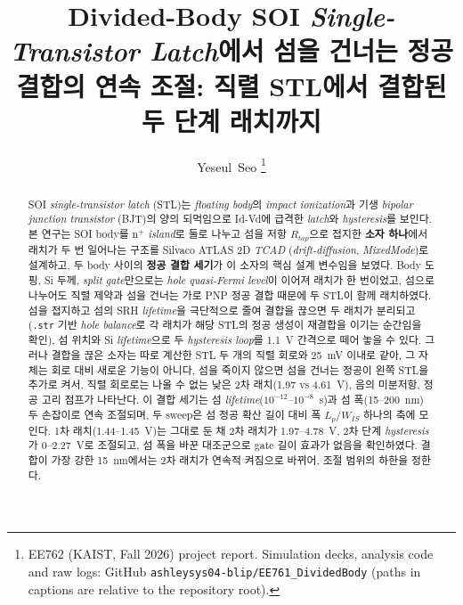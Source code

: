 \documentclass[journal]{IEEEtran}
\begin{document}
\title{Divided-Body SOI \textit{Single-Transistor Latch}에서 섬을 건너는 정공 결합의 연속 조절: 직렬 STL에서 결합된 두 단계 래치까지}

\author{Yeseul~Seo%
\thanks{EE762 (KAIST, Fall 2026) project report. Simulation decks, analysis code and raw logs: GitHub \texttt{ashleysys04-blip/EE761\_DividedBody} (paths in captions are relative to the repository root).}}

\maketitle

\begin{abstract}
SOI \textit{single-transistor latch} (STL)는 \textit{floating body}의 \textit{impact ionization}과 기생 \textit{bipolar junction transistor} (BJT)의 양의 되먹임으로 Id-Vd에 급격한 \textit{latch}와 \textit{hysteresis}를 보인다. 본 연구는 SOI body를 n$^+$ \textit{island}로 둘로 나누고 섬을 저항 $R_{tap}$으로 접지한 \textbf{소자 하나}에서 래치가 두 번 일어나는 구조를 Silvaco ATLAS 2D \textit{TCAD} (\textit{drift-diffusion}, \textit{MixedMode})로 설계하고, 두 body 사이의 \textbf{정공 결합 세기}가 이 소자의 핵심 설계 변수임을 보였다. Body 도핑, Si 두께, \textit{split gate}만으로는 \textit{hole quasi-Fermi level}이 이어져 래치가 한 번이었고, 섬으로 나누어도 직렬 제약과 섬을 건너는 가로 PNP 정공 결합 때문에 두 STL이 함께 래치하였다. 섬을 접지하고 섬의 SRH \textit{lifetime}을 극단적으로 줄여 결합을 끊으면 두 래치가 분리되고(\texttt{.str} 기반 \textit{hole balance}로 각 래치가 해당 STL의 정공 생성이 재결합을 이기는 순간임을 확인), 섬 위치와 Si \textit{lifetime}으로 두 \textit{hysteresis loop}를 1.1~V 간격으로 떼어 놓을 수 있다. 그러나 결합을 끊은 소자는 따로 계산한 STL 두 개의 직렬 회로와 25~mV 이내로 같아, 그 자체는 회로 대비 새로운 기능이 아니다. 섬을 죽이지 않으면 섬을 건너는 정공이 왼쪽 STL을 추가로 켜서, 직렬 회로로는 나올 수 없는 낮은 2차 래치(1.97 vs 4.61~V), 음의 미분저항, 정공 고리 점프가 나타난다. 이 결합 세기는 섬 \textit{lifetime}($10^{-12}$--$10^{-8}$~s)과 섬 폭(15--200~nm) 두 손잡이로 연속 조절되며, 두 sweep은 섬 정공 확산 길이 대비 폭 $L_p/W_{IS}$ 하나의 축에 모인다. 1차 래치(1.44--1.45~V)는 그대로 둔 채 2차 래치가 1.97--4.78~V, 2차 단계 \textit{hysteresis}가 0--2.27~V로 조절되고, 섬 폭을 바꾼 대조군으로 gate 길이 효과가 없음을 확인하였다. 결합이 가장 강한 15~nm에서는 2차 래치가 연속적 켜짐으로 바뀌어, 조절 범위의 하한을 정한다.
\end{abstract}
\end{document}
